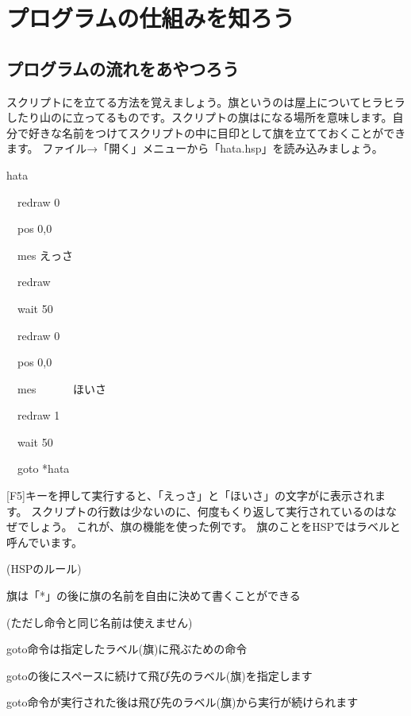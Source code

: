 \documentclass[text02.tex]{subfiles}
\begin{document}
\clearpage

\section{プログラムの仕組みを知ろう}
\subsection{プログラムの流れをあやつろう}

スクリプトにを立てる方法を覚えましょう。旗というのは屋上についてヒラヒラしたり山のに立ってるものです。スクリプトの旗はになる場所を意味します。自分で好きな名前をつけてスクリプトの中に目印として旗を立てておくことができます。
ファイル→「開く」メニューから「hata.hsp」を読み込みましょう。

\begin{description}
    \item *hata
    \item \ \ redraw 0
    \item \ \ pos 0,0
    \item \ \ mes {\textquotedbl}えっさ{\textquotedbl}
    \item \ \ redraw 
    \item \ \ wait 50
    \item \ \ redraw 0
    \item \ \ pos 0,0
    \item \ \ mes {\textquotedbl}　　　ほいさ{\textquotedbl}
    \item \ \ redraw 1
    \item \ \ wait 50
    \item \ \ goto *hata
\end{description}

[F5]キーを押して実行すると、「えっさ」と「ほいさ」の文字がに表示されます。
スクリプトの行数は少ないのに、何度もくり返して実行されているのはなぜでしょう。
これが、旗の機能を使った例です。
旗のことをHSPではラベルと呼んでいます。

\begin{description}
    \item (HSPのルール)
\end{description}

\begin{description}
    \item 旗は「*」の後に旗の名前を自由に決めて書くことができる
    \item (ただし命令と同じ名前は使えません)
    \item goto命令は指定したラベル(旗)に飛ぶための命令
    \item gotoの後にスペースに続けて飛び先のラベル(旗)を指定します
    \item goto命令が実行された後は飛び先のラベル(旗)から実行が続けられます
\end{description}
\end{document}
